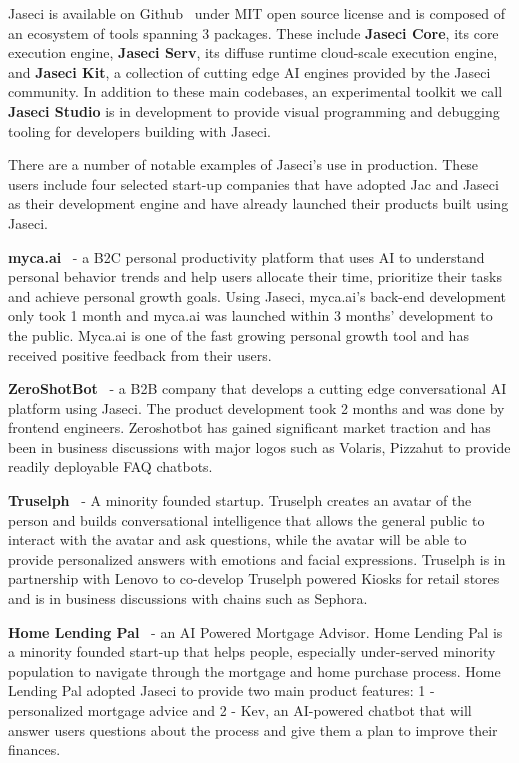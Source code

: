 
Jaseci is available on Github~\cite{jaseci-github} under MIT open source license and is composed of an ecosystem of tools spanning 3 packages.
These include \textbf{Jaseci Core}, its core execution engine,  \textbf{Jaseci Serv}, its diffuse runtime cloud-scale execution engine, and \textbf{Jaseci Kit}, a collection of cutting edge AI engines provided by the Jaseci community.
In addition to these main codebases, an experimental toolkit we call \textbf{Jaseci Studio} is in development to provide visual programming and debugging tooling for developers building with Jaseci.

There are a number of notable examples of Jaseci's use in production.
These users include  four selected start-up companies that have adopted Jac and Jaseci as their development engine and have already launched their products built using Jaseci.

\indent \textbf{ myca.ai}~\cite{myca-website} - a B2C personal productivity platform that uses AI to understand personal behavior trends and help users allocate their time, prioritize their tasks and achieve personal growth goals. Using Jaseci, myca.ai’s back-end development only took 1 month and myca.ai was launched within 3 months’ development to the public. Myca.ai is one of the fast growing personal growth tool and has received positive feedback from their users.

\indent \textbf{ZeroShotBot}~\cite{zsb-website} - a B2B company that develops a cutting edge conversational AI platform using Jaseci. The product development took 2 months and was done by frontend engineers. Zeroshotbot has gained significant market traction and has been in business discussions with major logos such as Volaris, Pizzahut to provide readily deployable FAQ chatbots.



\indent \textbf{Truselph}~\cite{ts-website} - A minority founded startup. Truselph creates an avatar of the person and builds conversational intelligence that allows the general public to interact with the avatar and ask questions, while the avatar will be able to provide personalized answers with emotions and facial expressions. Truselph is in partnership with Lenovo to co-develop Truselph powered Kiosks for retail stores and is in business discussions with chains such as Sephora.


\indent \textbf{ Home Lending Pal}~\cite{hlp-website} - an AI Powered Mortgage Advisor. Home Lending Pal is a minority founded start-up that helps people, especially under-served minority population to navigate through the mortgage and home purchase process. Home Lending Pal adopted Jaseci to provide two main product features: 1 - personalized mortgage advice and 2 - Kev, an AI-powered chatbot that will answer users questions about the process and give them a plan to improve their finances.